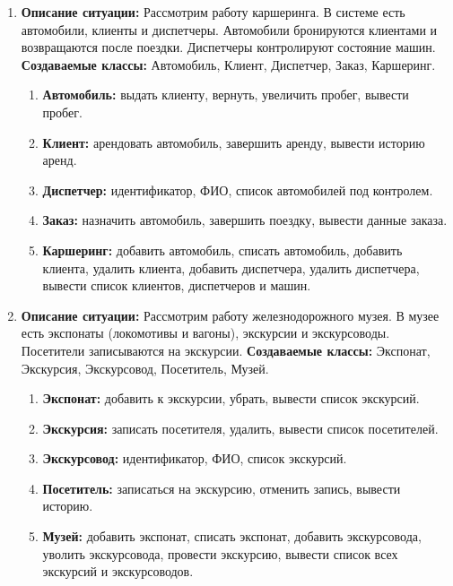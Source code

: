 \begin{enumerate}
\item
\textbf{Описание ситуации:}
Рассмотрим работу каршеринга. В системе есть автомобили, клиенты и диспетчеры. 
Автомобили бронируются клиентами и возвращаются после поездки. Диспетчеры контролируют состояние машин.
\textbf{Создаваемые классы:} Автомобиль, Клиент, Диспетчер, Заказ, Каршеринг.
\begin{enumerate}
    \item \textbf{Автомобиль:} выдать клиенту, вернуть, увеличить пробег, вывести пробег.
    \item \textbf{Клиент:} арендовать автомобиль, завершить аренду, вывести историю аренд.
    \item \textbf{Диспетчер:} идентификатор, ФИО, список автомобилей под контролем.
    \item \textbf{Заказ:} назначить автомобиль, завершить поездку, вывести данные заказа.
    \item \textbf{Каршеринг:} добавить автомобиль, списать автомобиль, добавить клиента, удалить клиента, 
    добавить диспетчера, удалить диспетчера,
    вывести список клиентов, диспетчеров и машин.
\end{enumerate}

\item
\textbf{Описание ситуации:}
Рассмотрим работу железнодорожного музея. 
В музее есть экспонаты (локомотивы и вагоны), 
экскурсии и экскурсоводы. Посетители записываются на экскурсии.
\textbf{Создаваемые классы:} Экспонат, Экскурсия, Экскурсовод, Посетитель, Музей.
\begin{enumerate}
    \item \textbf{Экспонат:} добавить к экскурсии, убрать, вывести список экскурсий.
    \item \textbf{Экскурсия:} записать посетителя, удалить, вывести список посетителей.
    \item \textbf{Экскурсовод:} идентификатор, ФИО, список экскурсий.
    \item \textbf{Посетитель:} записаться на экскурсию, отменить запись, вывести историю.
    \item \textbf{Музей:} добавить экспонат, списать экспонат, добавить экскурсовода, уволить экскурсовода, 
    провести экскурсию, вывести список всех экскурсий и экскурсоводов.
\end{enumerate}


\end{enumerate}
